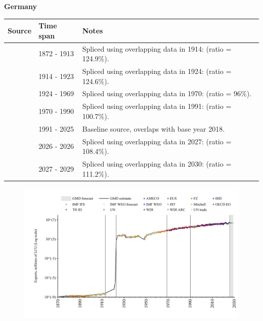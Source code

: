 \documentclass[12pt,a4paper,landscape]{article}
\begin{document}
\begin{adjustbox}{max totalsize={\paperwidth}{\paperheight},center}
\begin{minipage}[t][\textheight][t]{\textwidth}
\vspace*{0.5cm}
{}
\begin{center}
{\Large\bfseries Germany}
\end{center}
\vspace{0.5cm}
\begin{table}[H]
\centering
\small
\begin{tabular}{|l|l|l|}
\hline
\textbf{Source} & \textbf{Time span} & \textbf{Notes} \\
\hline
\rowcolor{white}\cite{JST}& 1872 - 1913 &Spliced using overlapping data in 1914: (ratio = 124.9\%).\\
\rowcolor{lightgray}\cite{UN_trade}& 1914 - 1923 &Spliced using overlapping data in 1924: (ratio = 124.6\%).\\
\rowcolor{white}\cite{JST}& 1924 - 1969 &Spliced using overlapping data in 1970: (ratio = 96\%).\\
\rowcolor{lightgray}\cite{WDI}& 1970 - 1990 &Spliced using overlapping data in 1991: (ratio = 100.7\%).\\
\rowcolor{white}\cite{OECD_EO}& 1991 - 2025 &Baseline source, overlaps with base year 2018.\\
\rowcolor{lightgray}\cite{AMECO}& 2026 - 2026 &Spliced using overlapping data in 2027: (ratio = 108.4\%).\\
\rowcolor{white}\cite{IMF_WEO_forecast}& 2027 - 2029 &Spliced using overlapping data in 2030: (ratio = 111.2\%).\\
\hline
\end{tabular}
\end{table}
\begin{figure}[H]
\centering
\includegraphics[width=\textwidth,height=0.6\textheight,keepaspectratio]{graphs/DEU_exports.pdf}
\end{figure}
\end{minipage}
\end{adjustbox}
\end{document}
